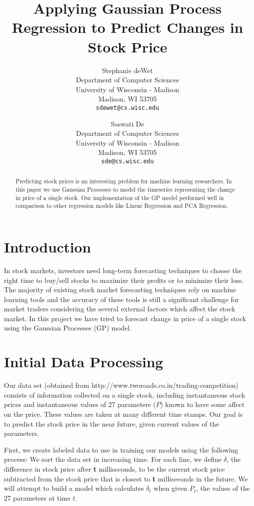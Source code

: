 \documentclass{article} %
\author{
Stephanie deWet \\
Department of Computer Sciences\\
University of Wisconsin - Madison \\
Madison, WI 53705 \\
\texttt{sdewet@cs.wisc.edu} \\
\and
Saswati De \\
Department of Computer Sciences\\
University of Wisconsin - Madison \\
Madison, WI 53705 \\
\texttt{sde@cs.wisc.edu} \\
}
\title{Applying Gaussian Process Regression to Predict Changes in Stock Price}
\begin{document}
\maketitle

\begin{abstract}
Predicting stock prices is an interesting problem for machine learning researchers. In this paper we use Gaussian Processes to model the timeseries representing the change in price of a single stock. Our implementation of the GP model performed well in comparison to other regression models like Linear Regression and PCA Regression.
\end{abstract}

\section{Introduction}
In stock markets, investors need long-term forecasting techniques to choose the right time to buy/sell stocks to maximize their profits or to minimize their loss. The majority of existing stock market forecasting techniques rely on machine learning tools and the accuracy of these tools is still a significant challenge for market traders considering the several external factors which affect the stock market. In this project we have tried to forecast change in price of a single stock using the Gaussian Processes (GP) model.

\section{Initial Data Processing}
Our data set (obtained from http://www.tworoads.co.in/trading-competition) consists of information collected on a single stock, including instantaneous stock prices and instantaneous values of 27 parameters ($P$) known to have some affect on the price.
These values are taken at many different time stamps.
Our goal is to predict the stock price in the near future, given current values of the parameters.

First, we create labeled data to use in training our models using the following process:
We sort the data set in increasing time.
For each line, we define $\delta$, the difference in stock price after \textbf{t} milliseconds, to be the current stock price subtracted from the stock price that is closest to \textbf{t} milliseconds in the future.
We will attempt to build a model which calculates $\delta_t$ when given $P_t$, the values of the 27 parameters at time $t$.
\end{document}
